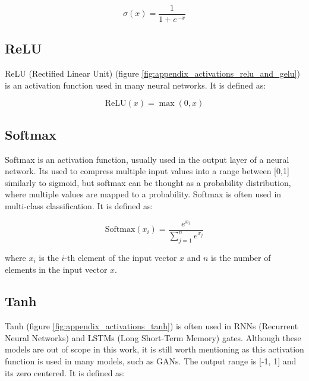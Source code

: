 \begin{equation*}
    \sigma(x) = \frac{1}{1 + e^{-x}}
\end{equation*}









\subsection*{ReLU}

ReLU (Rectified Linear Unit) (figure \ref{fig:appendix_activations_relu_and_gelu}) is an activation function used in many neural networks. It is defined as:

\begin{equation*}
    \text{ReLU}(x) = \max(0, x)
\end{equation*}








\subsection*{Softmax}

Softmax is an activation function, usually used in the output layer of a neural network. Its used to compress multiple input values into a range between [0,1] similarly to sigmoid, but softmax can be thought as a probability distribution, where multiple values are mapped to a probability. Softmax is often used in multi-class classification. It is defined as:

\begin{equation*}
    \text{Softmax}(x_i) = \frac{e^{x_i}}{\sum_{j=1}^{n} e^{x_j}}
\end{equation*}

where $x_i$ is the $i$-th element of the input vector $x$ and $n$ is the number of elements in the input vector $x$.






\subsection*{Tanh}

Tanh (figure \ref{fig:appendix_activations_tanh}) is often used in RNNs (Recurrent Neural Networks) and LSTMs (Long Short-Term Memory) gates. Although these models are out of scope in this work, it is still worth mentioning as this activation function is used in many models, such as GANs. The output range is [-1, 1] and its zero centered. It is defined as:

